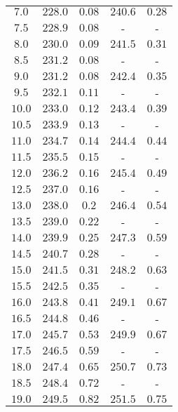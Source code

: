 \begin{table}
\begin{tabular}{c c c c c}
        $\num{7.0}$&$\num{228.0}$&$\num{0.08}$&$\num{240.6}$&$\num{0.28}$\\
        $\num{7.5}$&$\num{228.9}$&$\num{0.08}$&-&-\\
        $\num{8.0}$&$\num{230.0}$&$\num{0.09}$&$\num{241.5}$&$\num{0.31}$\\
        $\num{8.5}$&$\num{231.2}$&$\num{0.08}$&-&-\\
        $\num{9.0}$&$\num{231.2}$&$\num{0.08}$&$\num{242.4}$&$\num{0.35}$\\
        $\num{9.5}$&$\num{232.1}$&$\num{0.11}$&-&-\\
        $\num{10.0}$&$\num{233.0}$&$\num{0.12}$&$\num{243.4}$&$\num{0.39}$\\
        $\num{10.5}$&$\num{233.9}$&$\num{0.13}$&-&-\\
        $\num{11.0}$&$\num{234.7}$&$\num{0.14}$&$\num{244.4}$&$\num{0.44}$\\
        $\num{11.5}$&$\num{235.5}$&$\num{0.15}$&-&-\\
        $\num{12.0}$&$\num{236.2}$&$\num{0.16}$&$\num{245.4}$&$\num{0.49}$\\
        $\num{12.5}$&$\num{237.0}$&$\num{0.16}$&-&-\\
        $\num{13.0}$&$\num{238.0}$&$\num{0.2}$&$\num{246.4}$&$\num{0.54}$\\
        $\num{13.5}$&$\num{239.0}$&$\num{0.22}$&-&-\\
        $\num{14.0}$&$\num{239.9}$&$\num{0.25}$&$\num{247.3}$&$\num{0.59}$\\
        $\num{14.5}$&$\num{240.7}$&$\num{0.28}$&-&-\\
        $\num{15.0}$&$\num{241.5}$&$\num{0.31}$&$\num{248.2}$&$\num{0.63}$\\
        $\num{15.5}$&$\num{242.5}$&$\num{0.35}$&-&-\\
        $\num{16.0}$&$\num{243.8}$&$\num{0.41}$&$\num{249.1}$&$\num{0.67}$\\
        $\num{16.5}$&$\num{244.8}$&$\num{0.46}$&-&-\\
        $\num{17.0}$&$\num{245.7}$&$\num{0.53}$&$\num{249.9}$&$\num{0.67}$\\
        $\num{17.5}$&$\num{246.5}$&$\num{0.59}$&-&-\\
        $\num{18.0}$&$\num{247.4}$&$\num{0.65}$&$\num{250.7}$&$\num{0.73}$\\
        $\num{18.5}$&$\num{248.4}$&$\num{0.72}$&-&-\\
        $\num{19.0}$&$\num{249.5}$&$\num{0.82}$&$\num{251.5}$&$\num{0.75}$\\

\end{tabular}
\end{table}
